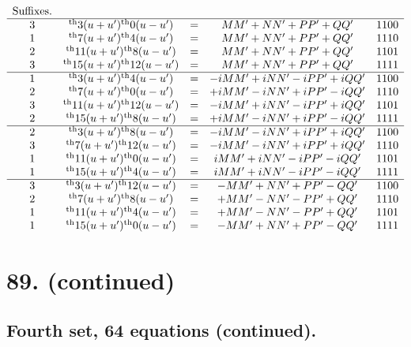 \documentclass[11pt,a4paper]{book}
\providecommand{\uth}{\textsuperscript{th}}
\begin{document}
\[
\begin{array}{ccccc}
\text{Suffixes.} & & & & \\
\hline
3 & \uth{3}(u+u')\uth{0}(u-u') &=& MM' + NN' + PP' + QQ' & 1100 \\
1 & \uth{7}(u+u')\uth{4}(u-u') &=& MM' + NN' + PP' + QQ' & 1110 \\
2 & \uth{11}(u+u')\uth{8}(u-u') &=& MM' + NN' + PP' + QQ' & 1101 \\
3 & \uth{15}(u+u')\uth{12}(u-u') &=& MM' + NN' + PP' + QQ' & 1111 \\
\hline
1 & \uth{3}(u+u')\uth{4}(u-u') &=& -iMM' + iNN' - iPP' + iQQ' & 1100 \\
2 & \uth{7}(u+u')\uth{0}(u-u') &=& +iMM' - iNN' + iPP' - iQQ' & 1110 \\
3 & \uth{11}(u+u')\uth{12}(u-u') &=& -iMM' + iNN' - iPP' + iQQ' & 1101 \\
2 & \uth{15}(u+u')\uth{8}(u-u') &=& +iMM' - iNN' + iPP' - iQQ' & 1111 \\
\hline
2 & \uth{3}(u+u')\uth{8}(u-u') &=& -iMM' - iNN' + iPP' + iQQ' & 1100 \\
3 & \uth{7}(u+u')\uth{12}(u-u') &=& -iMM' - iNN' + iPP' + iQQ' & 1110 \\
1 & \uth{11}(u+u')\uth{0}(u-u') &=& iMM' + iNN' - iPP' - iQQ' & 1101 \\
1 & \uth{15}(u+u')\uth{4}(u-u') &=& iMM' + iNN' - iPP' - iQQ' & 1111 \\
\hline
3 & \uth{3}(u+u')\uth{12}(u-u') &=& -MM' + NN' + PP' - QQ' & 1100 \\
2 & \uth{7}(u+u')\uth{8}(u-u') &=& +MM' - NN' - PP' + QQ' & 1110 \\
1 & \uth{11}(u+u')\uth{4}(u-u') &=& +MM' - NN' - PP' + QQ' & 1101 \\
1 & \uth{15}(u+u')\uth{0}(u-u') &=& -MM' + NN' + PP' - QQ' & 1111
\end{array}
\]


\newpage
\section*{89. (continued)}
\label{sec:89cont}

\subsection*{Fourth set, 64 equations (continued).}
\end{document}
